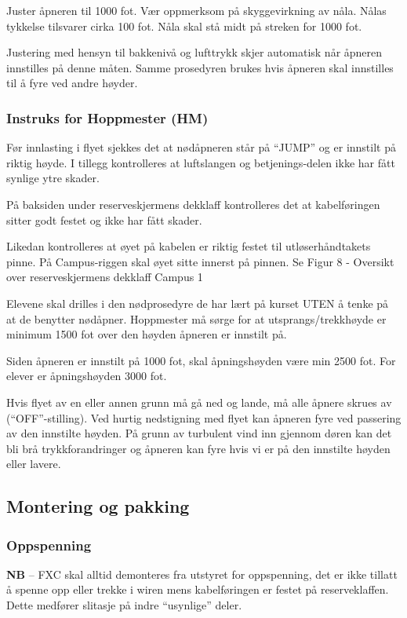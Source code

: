 Juster åpneren til 1000 fot. Vær oppmerksom på skyggevirkning av nåla. Nålas tykkelse tilsvarer cirka 100 fot. Nåla skal stå midt på streken for 1000 fot.

Justering med hensyn til bakkenivå og lufttrykk skjer automatisk når åpneren innstilles på denne måten. Samme prosedyren brukes hvis åpneren skal innstilles til å fyre ved andre høyder.

\subsubsection{Instruks for Hoppmester (HM)}
Før innlasting i flyet sjekkes det at nødåpneren står på ``JUMP'' og er innstilt på riktig høyde. I tillegg kontrolleres at luftslangen og betjenings-delen ikke har fått synlige ytre skader.

På baksiden under reserveskjermens dekklaff kontrolleres det at kabelføringen sitter godt festet og ikke har fått skader.

Likedan kontrolleres at øyet på kabelen er riktig festet til utløserhåndtakets pinne. På Campus-riggen skal øyet sitte innerst på pinnen. Se Figur 8 - Oversikt over reserveskjermens dekklaff Campus 1

Elevene skal drilles i den nødprosedyre de har lært på kurset UTEN å tenke på at de benytter nødåpner. Hoppmester må sørge for at utsprangs/trekkhøyde er minimum 1500 fot over den høyden åpneren er innstilt på.

Siden åpneren er innstilt på 1000 fot, skal åpningshøyden være min 2500 fot. For elever er åpningshøyden 3000 fot.

Hvis flyet av en eller annen grunn må gå ned og lande, må alle åpnere skrues av (``OFF''-stilling). Ved hurtig nedstigning med flyet kan åpneren fyre ved passering av den innstilte høyden. På grunn av turbulent vind inn gjennom døren kan det bli brå trykkforandringer og åpneren kan fyre hvis vi er på den innstilte høyden eller lavere.

\subsection{Montering og pakking}
\subsubsection{Oppspenning}
\textbf{NB} – FXC skal alltid demonteres fra utstyret for oppspenning, det er ikke tillatt å spenne opp eller trekke i wiren mens kabelføringen er festet på reserveklaffen. Dette medfører slitasje på indre ``usynlige'' deler.


